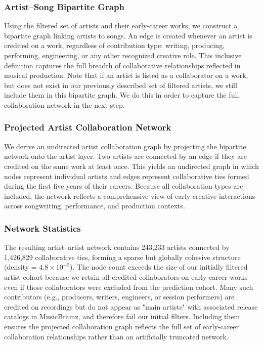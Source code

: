\documentclass[fleqn,10pt]{wlscirep}
\begin{document}
\subsubsection*{Artist--Song Bipartite Graph}
Using the filtered set of artists and their early-career works, we construct a bipartite graph linking artists to songs. An edge is created whenever an artist is credited on a work, regardless of contribution type: writing, producing, performing, engineering, or any other recognized creative role. This inclusive definition captures the full breadth of collaborative relationships reflected in musical production. Note that if an artist is listed as a collaborator on a work, but does not exist in our previously described set of filtered artists, we still include them in this bipartite graph. We do this in order to capture the full collaboration network in the next step.

\subsubsection*{Projected Artist Collaboration Network}
We derive an undirected artist collaboration graph by projecting the bipartite network onto the artist layer. Two artists are connected by an edge if they are credited on the same work at least once. This yields an undirected graph in which nodes represent individual artists and edges represent collaborative ties formed during the first five years of their careers. Because all collaboration types are included, the network reflects a comprehensive view of early creative interactions across songwriting, performance, and production contexts.

\subsubsection*{Network Statistics}
The resulting artist–artist network contains 243,233 artists connected by 1,426,829 collaborative ties, forming a sparse but globally cohesive structure (density = $4.8 \times 10^{-5}$). The node count exceeds the size of our initially filtered artist cohort because we retain all credited collaborators on early-career works even if those collaborators were excluded from the prediction cohort. Many such contributors (e.g., producers, writers, engineers, or session performers) are credited on recordings but do not appear as "main artists" with associated release catalogs in MusicBrainz, and therefore fail our initial filters. Including them ensures the projected collaboration graph reflects the full set of early-career collaboration relationships rather than an artificially truncated network.
\end{document}
